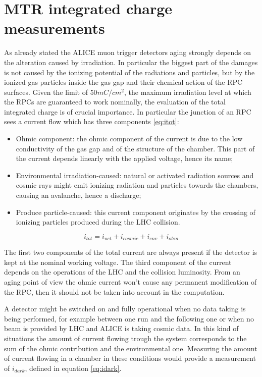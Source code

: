 \section{MTR integrated charge measurements}
As already stated the ALICE muon trigger detectors aging strongly depends on the alteration caused by irradiation.
In particular the biggest part of the damages is not caused by the ionizing potential of the radiations and particles, but by the ionized gas particles inside the gas gap and their chemical action of the RPC surfaces.
Given the limit of $50mC/cm^2$, the maximum irradiation level at which the RPCs are guaranteed to work nominally, the evaluation of the total integrated charge is of crucial importance.
In particular the junction of an RPC sees a current flow which has three components \ref{eq:itot}:
\begin{itemize}
\item Ohmic component: the ohmic component of the current is due to the low conductivity of the gas gap and of the structure of the chamber. This part of the current depends linearly with the applied voltage, hence its name;
\item Environmental irradiation-caused: natural or activated radiation sources and cosmic rays might emit ionizing radiation and particles towards the chambers, causing an avalanche, hence a discharge;
\item Produce particle-caused: this current component originates by the crossing of ionizing particles produced during the LHC collision.
\end{itemize}

\begin{equation}
\label{eq:itot}
i_{tot}=i_{net}+i_{cosmic}+i_{env}+i_{ohm}
\end{equation}

The first two components of the total current are always present if the detector is kept at the nominal working voltage.
The third component of the current depends on the operations of the LHC and the collision luminosity.
From an aging point of view the ohmic current won't cause any permanent modification of the RPC, then it should not be taken into account in the computation.

A detector might be switched on and fully operational when no data taking is being performed, for example between one run and the following one or when no beam is provided by LHC and ALICE is taking cosmic data.
In this kind of situations the amount of current flowing trough the system corresponds to the sum of the ohmic contribution and the environmental one.
Measuring the amount of current flowing in a chamber in these conditions would provide a measurement of $i_{dark}$, defined in equation \ref{eq:idark}.

